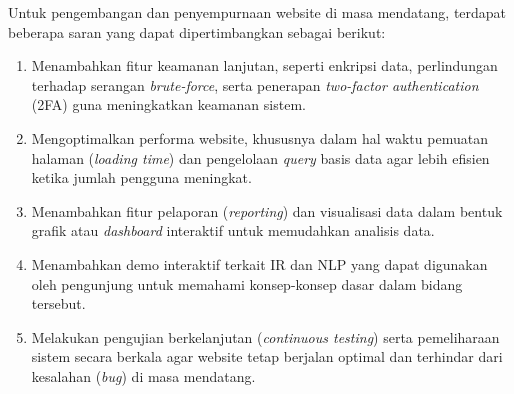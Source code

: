 Untuk pengembangan dan penyempurnaan website di masa mendatang, terdapat beberapa saran yang dapat dipertimbangkan sebagai berikut:

\begin{enumerate}
	\item Menambahkan fitur keamanan lanjutan, seperti enkripsi data, perlindungan terhadap serangan \textit{brute-force}, serta penerapan \textit{two-factor authentication} (2FA) guna meningkatkan keamanan sistem.
	
	\item Mengoptimalkan performa website, khususnya dalam hal waktu pemuatan halaman (\textit{loading time}) dan pengelolaan \textit{query} basis data agar lebih efisien ketika jumlah pengguna meningkat.
	
	\item Menambahkan fitur pelaporan (\textit{reporting}) dan visualisasi data dalam bentuk grafik atau \textit{dashboard} interaktif untuk memudahkan analisis data.
	
	\item Menambahkan demo interaktif terkait IR dan NLP yang dapat digunakan oleh pengunjung untuk memahami konsep-konsep dasar dalam bidang tersebut.
	
	\item Melakukan pengujian berkelanjutan (\textit{continuous testing}) serta pemeliharaan sistem secara berkala agar website tetap berjalan optimal dan terhindar dari kesalahan (\textit{bug}) di masa mendatang.
\end{enumerate}
